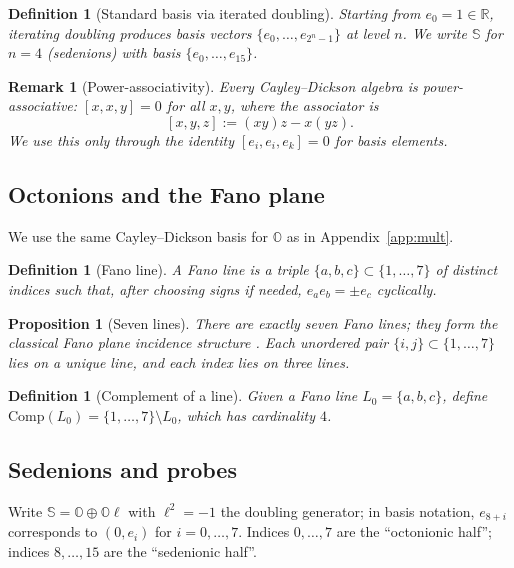 \documentclass[12pt,a4paper]{article}
\newtheorem{proposition}[theorem]{Proposition}
\newtheorem{definition}[theorem]{Definition}
\newtheorem{remark}[theorem]{Remark}
\begin{document}
\begin{definition}[Standard basis via iterated doubling]
Starting from $e_0=1\in\mathbb{R}$, iterating doubling produces basis vectors $\{e_0,\dots,e_{2^n-1}\}$ at level $n$.
We write $\mathbb{S}$ for $n=4$ (sedenions) with basis $\{e_0,\dots,e_{15}\}$.
\end{definition}

\begin{remark}[Power-associativity]
Every Cayley--Dickson algebra is \emph{power-associative}: $[x,x,y]=0$ for all $x,y$, where the associator is
\begin{equation}\label{eq:assoc-def}
[x,y,z]:=(xy)z-x(yz).
\end{equation}
We use this only through the identity $[e_i,e_i,e_k]=0$ for basis elements.
\end{remark}

\subsection{Octonions and the Fano plane}
We use the same Cayley--Dickson basis for $\mathbb{O}$ as in Appendix~\ref{app:mult}.

\begin{definition}[Fano line]
A \emph{Fano line} is a triple $\{a,b,c\}\subset\{1,\dots,7\}$ of distinct indices such that, after choosing signs if needed,
$e_ae_b=\pm e_c$ cyclically.
\end{definition}

\begin{proposition}[Seven lines]\label{prop:fano}
There are exactly seven Fano lines; they form the classical Fano plane incidence structure \cite{Baez2002}.
Each unordered pair $\{i,j\}\subset\{1,\dots,7\}$ lies on a unique line, and each index lies on three lines.
\end{proposition}

\begin{definition}[Complement of a line]
Given a Fano line $L_0=\{a,b,c\}$, define $\mathrm{Comp}(L_0)=\{1,\dots,7\}\setminus L_0$, which has cardinality $4$.
\end{definition}

\subsection{Sedenions and probes}
Write $\mathbb{S}=\mathbb{O}\oplus \mathbb{O}\ell$ with $\ell^2=-1$ the doubling generator; in basis notation, $e_{8+i}$ corresponds to $(0,e_i)$ for $i=0,\dots,7$.
Indices $0,\dots,7$ are the ``octonionic half''; indices $8,\dots,15$ are the ``sedenionic half''.
\end{document}
